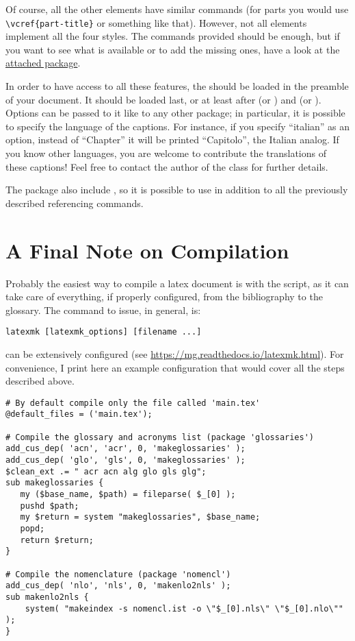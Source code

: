 Of course, all the other elements have similar commands (\eg for parts 
you would use \lstinline|\vcref{part-title}| or something like that). 
However, not all elements implement all the four styles. The commands 
provided should be enough, but if you want to see what is available or 
to add the missing ones, have a look at the 
\href{styles/kaorefs.sty}{attached package}.

In order to have access to all these features, the  
should be loaded in the preamble of your document. It should be loaded 
last, or at least after  (or ) and 
 (or ). Options can be 
passed to it like to any other package; in particular, it is possible to 
specify the language of the captions. For instance, if you specify 
\enquote{italian} as an option, instead of \enquote{Chapter} it will be 
printed \enquote{Capitolo}, the Italian analog. If you know other 
languages, you are welcome to contribute the translations of these 
captions! Feel free to contact the author of the class for further 
details. 

The  package also include , so it is 
possible to use  in addition to all the previously 
described referencing commands.

\section{A Final Note on Compilation}
\label{compiling}

Probably the easiest way to compile a latex document is with the 
 script, as it can take care of everything, if properly 
configured, from the bibliography to the glossary. The command to issue, 
in general, is:

\begin{lstlisting}
latexmk [latexmk_options] [filename ...]
\end{lstlisting}

 can be extensively configured (see
\url{https://mg.readthedocs.io/latexmk.html}). For convenience, I print 
here an example configuration that would cover all the steps described 
above.

\begin{lstlisting}
# By default compile only the file called 'main.tex'
@default_files = ('main.tex');

# Compile the glossary and acronyms list (package 'glossaries')
add_cus_dep( 'acn', 'acr', 0, 'makeglossaries' );
add_cus_dep( 'glo', 'gls', 0, 'makeglossaries' );
$clean_ext .= " acr acn alg glo gls glg";
sub makeglossaries {
   my ($base_name, $path) = fileparse( $_[0] );
   pushd $path;
   my $return = system "makeglossaries", $base_name;
   popd;
   return $return;
}

# Compile the nomenclature (package 'nomencl')
add_cus_dep( 'nlo', 'nls', 0, 'makenlo2nls' );
sub makenlo2nls {
    system( "makeindex -s nomencl.ist -o \"$_[0].nls\" \"$_[0].nlo\"" );
}
\end{lstlisting}

